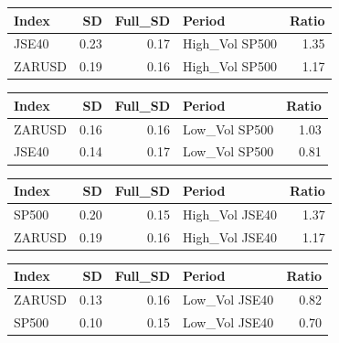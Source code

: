 \documentclass[11pt,preprint, authoryear]{elsarticle}
\let\origtable\table
\let\endorigtable\endtable
\renewenvironment{table}[1][2] {
    \expandafter\origtable\expandafter[H]
} {
    \endorigtable
}
\numberwithin{equation}{section}
\numberwithin{figure}{section}
\numberwithin{table}{section}
\begin{document}
\begin{table}[H]
\centering
\caption{S\&P 500 High Volatility} 
\begin{tabular}{lrrlr}
  \hline
Index & SD & Full\_SD & Period & Ratio \\ 
  \hline
JSE40 & 0.23 & 0.17 & High\_Vol SP500 & 1.35 \\ 
  ZARUSD & 0.19 & 0.16 & High\_Vol SP500 & 1.17 \\ 
   \hline
\end{tabular}
\end{table}
\begin{table}[H]
\centering
\caption{S\&P 500 Low Volatility} 
\begin{tabular}{lrrlr}
  \hline
Index & SD & Full\_SD & Period & Ratio \\ 
  \hline
ZARUSD & 0.16 & 0.16 & Low\_Vol SP500 & 1.03 \\ 
  JSE40 & 0.14 & 0.17 & Low\_Vol SP500 & 0.81 \\ 
   \hline
\end{tabular}
\end{table}

\begin{table}[H]
\centering
\caption{JSE Top 40 High Volatility} 
\begin{tabular}{lrrlr}
  \hline
Index & SD & Full\_SD & Period & Ratio \\ 
  \hline
SP500 & 0.20 & 0.15 & High\_Vol JSE40 & 1.37 \\ 
  ZARUSD & 0.19 & 0.16 & High\_Vol JSE40 & 1.17 \\ 
   \hline
\end{tabular}
\end{table}
\begin{table}[H]
\centering
\caption{JSE Top 40 Low Volatility} 
\begin{tabular}{lrrlr}
  \hline
Index & SD & Full\_SD & Period & Ratio \\ 
  \hline
ZARUSD & 0.13 & 0.16 & Low\_Vol JSE40 & 0.82 \\ 
  SP500 & 0.10 & 0.15 & Low\_Vol JSE40 & 0.70 \\ 
   \hline
\end{tabular}
\end{table}
\end{document}

